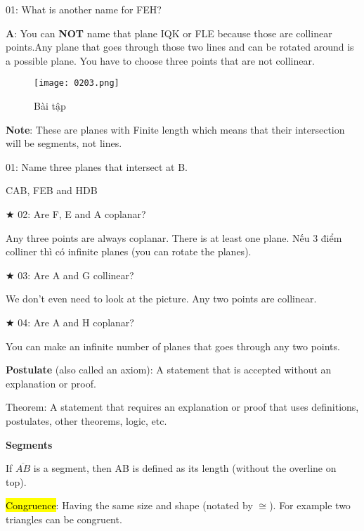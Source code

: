 01: What is another name for FEH?

\textbf{A}: You can \textbf{NOT} name that plane IQK or FLE because those are collinear points.Any plane that goes through those two lines and can be rotated around is a possible plane. You have to choose three points that are not collinear.

\begin{figure}[h!]
  \centering
  \texttt{[image: 0203.png]}
  \caption{Bài tập}
\end{figure}

\textbf{Note}: These are planes with Finite length which means that their intersection will be segments, not lines.

01: Name three planes that intersect at B.

CAB, FEB and HDB

$\bigstar$ 02: Are F, E and A coplanar?

Any three points are always coplanar. There is at least one plane. Nếu 3 điểm colliner thì có infinite planes (you can rotate the planes).

$\bigstar$ 03: Are A and G collinear?

We don't even need to look at the picture. Any two points are collinear.

$\bigstar$ 04: Are A and H coplanar?

You can make an infinite number of planes that goes through any two points.

\par\noindent\dotfill

\textbf{Postulate} (also called an axiom): A statement that is accepted without an explanation or proof.

Theorem: A statement that requires an explanation or proof that uses definitions, postulates, other theorems, logic, etc.

\vspace{1 cm}

\centerline{\textbf{\huge Segments}}

\vspace{0.2 cm}

If $\overline{AB}$ is a segment, then AB is defined as its length (without the overline on top).

\hl{Congruence}: Having the same size and shape (notated by $\cong$). For example two triangles can be congruent.

